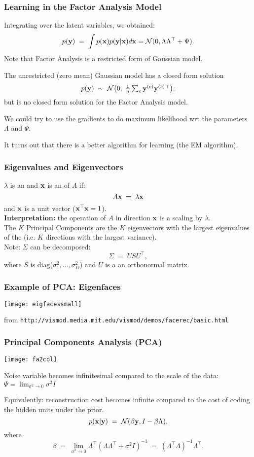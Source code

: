 \begin{frame}
\frametitle{Learning in the Factor Analysis Model}

Integrating over the latent variables, we obtained:
\[
p(\mathbf y)\;=\;\int p(\mathbf x) p(\mathbf y|\mathbf x) d\mathbf x = {\cal N}(0,\Lambda \Lambda{\scriptsize^{\top}} +
\Psi).
\]
Note that Factor Analysis is a restricted form of Gaussian model.

The unrestricted (zero mean) Gaussian model has a closed form solution
\[
p(\mathbf y)\;\sim\;{\cal N}\big(0,\;\textstyle\frac{1}{n}\sum_c\mathbf y^{(c)}\mathbf y^{(c)}{\scriptsize^{\top}}\big),
\]
but is no closed form solution for the Factor Analysis model.

We could try to use the gradients to do maximum likelihood wrt the parameters
$\Lambda$ and $\Psi$.

It turns out that there is a better algorithm for learning (the EM algorithm).
\end{frame}

\begin{frame}
\frametitle{Eigenvalues and Eigenvectors}

$\lambda$ is an  and $\mathbf x$ is an  of $A$ if:
%
\[
A \mathbf x\;=\;\lambda \mathbf x
\]
and $\mathbf x$ is a unit vector ($\mathbf x^\top \mathbf x = 1$). \\[1ex]

{\bf Interpretation:} the operation of $A$ in direction $\mathbf x$ is a scaling
by $\lambda$. \\[1ex]

The $K$ Principal Components are the $K$ eigenvectors with the largest
eigenvalues of the  (i.e. $K$ directions with
the largest variance). \\[1ex]

Note: $\Sigma$ can be decomposed:
\[
\Sigma\;=\; U S U^\top,
\]
where $S$ is diag($\sigma^2_1, \ldots, \sigma^2_D$) and $U$ is a
an orthonormal matrix.
\end{frame}

\begin{frame}
\frametitle{Example of PCA: Eigenfaces}

\centerline{\texttt{[image: eigfacessmall]}}

from \texttt{http://vismod.media.mit.edu/vismod/demos/facerec/basic.html}
\end{frame}

\begin{frame}
\frametitle{Principal Components Analysis (PCA)}
\vskip 3mm

\centerline{\texttt{[image: fa2col]}}

Noise variable becomes infinitesimal compared to the scale of the
data: $\displaystyle \Psi = \lim_{\sigma^2 \rightarrow 0} \sigma^2 I $

Equivalently: reconstruction cost becomes infinite compared to the
cost of coding the hidden units under the prior.
\[
p(\mathbf x|\mathbf y)\;=\;{\cal N}(\beta \mathbf y, I - \beta \Lambda),
\]
where
\[
\beta\;=\;\lim_{\sigma^2 \rightarrow 0} \Lambda^\top (\Lambda \Lambda^\top +
\sigma^2 I)^{-1}\;=\;(\Lambda^\top \Lambda)^{-1} \Lambda^\top.
\]
\end{frame}

